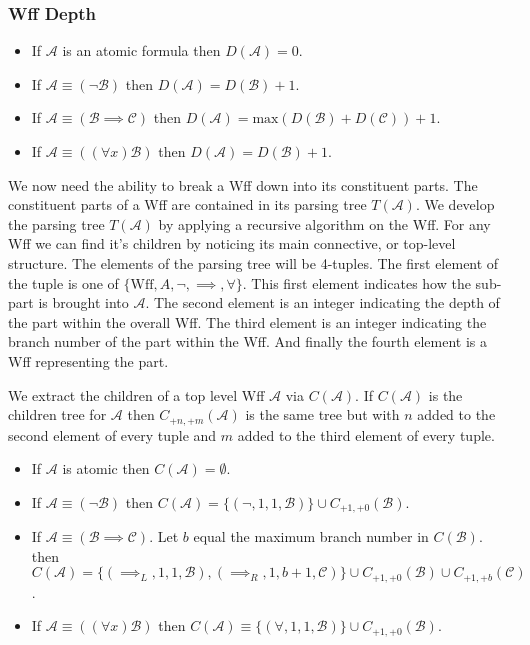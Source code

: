 \documentclass[12pt]{article}
\theoremstyle{break}
\theoremstyle{break}
\theoremstyle{break}
\theoremstyle{break}
\newcommand{\mc}[1]{\mathcal{#1}}
\begin{document}
\subsubsection*{Wff Depth}

\begin{itemize}
\item{If $\mc{A}$ is an atomic formula then $D(\mc{A}) = 0$.}
\item{If $\mc{A} \equiv (\lnot \mc{B})$ then $D(\mc{A}) = D(\mc{B}) + 1$.}
\item{If $\mc{A} \equiv (\mc{B} \implies \mc{C})$ then $D(\mc{A}) = \text{max}(D(\mc{B}) + D(\mc{C})) + 1$.}
\item{If $\mc{A} \equiv ((\forall x) \mc{B})$ then $D(\mc{A}) = D(\mc{B}) + 1$.}
\end{itemize}
\hrulefill

We now need the ability to break a Wff down into its constituent parts.
The constituent parts of a Wff are contained in its parsing tree $T(\mc{A})$.
We develop the parsing tree $T(\mc{A})$ by applying a recursive algorithm on the Wff. 
For any Wff we can find it's children by noticing its main connective, or top-level structure.
The elements of the parsing tree will be 4-tuples.
The first element of the tuple is one of $\{\text{Wff}, A, \lnot, \implies, \forall\}$.
This first element indicates how the sub-part is brought into $\mc{A}$. 
The second element is an integer indicating the depth of the part within the overall Wff.
The third element is an integer indicating the branch number of the part within the Wff.
And finally the fourth element is a Wff representing the part.

We extract the children of a top level Wff $\mc{A}$ via $C(\mc{A})$.
If $C(\mc{A})$ is the children tree for $\mc{A}$ then $C_{+n, +m}(\mc{A})$ is the same tree but with $n$ added to the second element of every tuple and $m$ added to the third element of every tuple.


\hrulefill
\begin{itemize}
\item{If $\mc{A}$ is atomic then $C(\mc{A}) = \emptyset$.}
\item{If $\mc{A} \equiv (\lnot \mc{B})$ then $C(\mc{A}) = \{(\lnot, 1, 1, \mc{B})\} \cup C_{+1, +0}(\mc{B})$.}
\item{If $\mc{A} \equiv (\mc{B} \implies \mc{C})$. Let $b$ equal the maximum branch number in $C(\mc{B})$. then $C(\mc{A}) = \{(\implies_L, 1, 1, \mc{B}), (\implies_R, 1, b+1, \mc{C})\} \cup C_{+1, +0}(\mc{B}) \cup C_{+1, +b}(\mc{C})$.}
\item{If $\mc{A} \equiv ((\forall x)\mc{B})$ then $C(\mc{A}) \equiv \{(\forall, 1, 1, \mc{B})\} \cup C_{+1, +0}(\mc{B})$.}
\end{itemize}
\hrulefill
\end{document}
